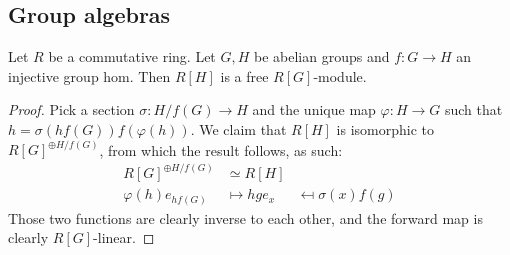 \subsection{Group algebras}


\begin{proposition}
  \label{0-grp-alg-free}

  Let $R$ be a commutative ring.
  Let $G, H$ be abelian groups and $f : G \to H$ an injective group hom.
  Then $R[H]$ is a free $R[G]$-module.
\end{proposition}
\begin{proof}

  Pick a section $\sigma : H / f(G) \to H$ and the unique map $\varphi : H \to G$
  such that $h = \sigma(h f(G)) f(\varphi(h))$.
  We claim that $R[H]$ is isomorphic to $R[G]^{\oplus H / f(G)}$, from which the result follows,
  as such:
  \begin{align*}
    R[G]^{\oplus H / f(G)} & \simeq R[H] \\
    \varphi(h) e_{h f(G)} & \mapsto h
    g e_x & \mapsfrom \sigma(x) f(g)
  \end{align*}
  Those two functions are clearly inverse to each other,
  and the forward map is clearly $R[G]$-linear.
\end{proof}


